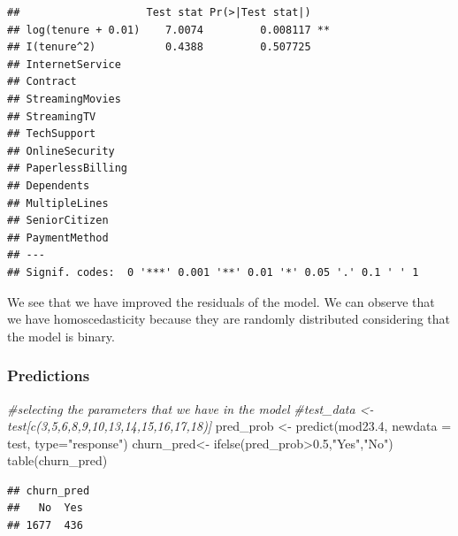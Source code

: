 \documentclass[
  twoside]{article}
\newenvironment{Shaded}{\begin{snugshade}}{\end{snugshade}}
\newcommand{\AttributeTok}[1]{\textcolor[rgb]{0.77,0.63,0.00}{#1}}
\newcommand{\CommentTok}[1]{\textcolor[rgb]{0.56,0.35,0.01}{\textit{#1}}}
\newcommand{\FloatTok}[1]{\textcolor[rgb]{0.00,0.00,0.81}{#1}}
\newcommand{\FunctionTok}[1]{\textcolor[rgb]{0.00,0.00,0.00}{#1}}
\newcommand{\NormalTok}[1]{#1}
\newcommand{\OtherTok}[1]{\textcolor[rgb]{0.56,0.35,0.01}{#1}}
\newcommand{\SpecialCharTok}[1]{\textcolor[rgb]{0.00,0.00,0.00}{#1}}
\newcommand{\StringTok}[1]{\textcolor[rgb]{0.31,0.60,0.02}{#1}}
\begin{document}
\begin{verbatim}
##                    Test stat Pr(>|Test stat|)   
## log(tenure + 0.01)    7.0074         0.008117 **
## I(tenure^2)           0.4388         0.507725   
## InternetService                                 
## Contract                                        
## StreamingMovies                                 
## StreamingTV                                     
## TechSupport                                     
## OnlineSecurity                                  
## PaperlessBilling                                
## Dependents                                      
## MultipleLines                                   
## SeniorCitizen                                   
## PaymentMethod                                   
## ---
## Signif. codes:  0 '***' 0.001 '**' 0.01 '*' 0.05 '.' 0.1 ' ' 1
\end{verbatim}

We see that we have improved the residuals of the model. We can observe
that we have homoscedasticity because they are randomly distributed
considering that the model is binary.

\hypertarget{predictions}{%
\subsubsection{Predictions}\label{predictions}}

\begin{Shaded}
\begin{Highlighting}[]
\CommentTok{\#selecting the parameters that we have in the model}
\CommentTok{\#test\_data \textless{}{-} test[c(3,5,6,8,9,10,13,14,15,16,17,18)]}
\NormalTok{pred\_prob }\OtherTok{\textless{}{-}} \FunctionTok{predict}\NormalTok{(mod23}\FloatTok{.4}\NormalTok{, }\AttributeTok{newdata =}\NormalTok{ test, }\AttributeTok{type=}\StringTok{"response"}\NormalTok{)}
\NormalTok{churn\_pred}\OtherTok{\textless{}{-}} \FunctionTok{ifelse}\NormalTok{(pred\_prob}\SpecialCharTok{\textgreater{}}\FloatTok{0.5}\NormalTok{,}\StringTok{"Yes"}\NormalTok{,}\StringTok{"No"}\NormalTok{)}
\FunctionTok{table}\NormalTok{(churn\_pred)}
\end{Highlighting}
\end{Shaded}

\begin{verbatim}
## churn_pred
##   No  Yes 
## 1677  436
\end{verbatim}

\begin{Shaded}
\end{Shaded}
\end{document}
